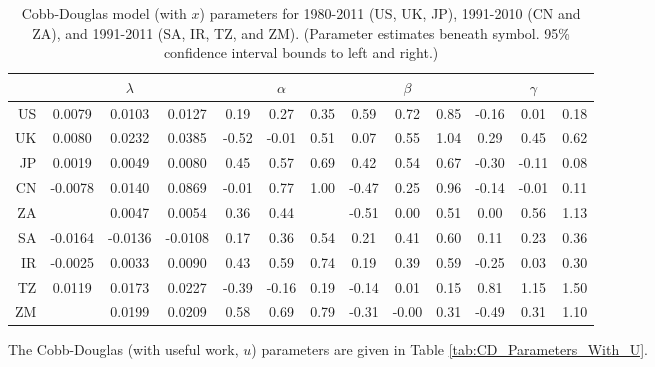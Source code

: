 \documentclass[preprint,authoryear,12pt]{elsarticle}\usepackage{graphicx, color}
\begin{document}
\begin{table}[H]
\begin{center}
\caption{Cobb-Douglas model (with $x$) parameters for 1980-2011 (US, UK, JP), 1991-2010 (CN and ZA), and 1991-2011 (SA, IR, TZ, and ZM). (Parameter estimates beneath symbol. 95\% confidence interval bounds to left and right.)}
\label{tab:CD_Parameters_With_X}
{\tiny
\begin{tabular}{r|ccc|ccc|ccc|ccc}
  \hline
 &   & $\lambda$ &   &   & $\alpha$ &   &   & $\beta$ &   &   & $\gamma$ &   \\ 
  \hline
US & 0.0079 & 0.0103 & 0.0127 & 0.19 & 0.27 & 0.35 & 0.59 & 0.72 & 0.85 & -0.16 & 0.01 & 0.18 \\ 
  UK & 0.0080 & 0.0232 & 0.0385 & -0.52 & -0.01 & 0.51 & 0.07 & 0.55 & 1.04 & 0.29 & 0.45 & 0.62 \\ 
  JP & 0.0019 & 0.0049 & 0.0080 & 0.45 & 0.57 & 0.69 & 0.42 & 0.54 & 0.67 & -0.30 & -0.11 & 0.08 \\ 
  CN & -0.0078 & 0.0140 & 0.0869 & -0.01 & 0.77 & 1.00 & -0.47 & 0.25 & 0.96 & -0.14 & -0.01 & 0.11 \\ 
  ZA &  & 0.0047 & 0.0054 & 0.36 & 0.44 &  & -0.51 & 0.00 & 0.51 & 0.00 & 0.56 & 1.13 \\ 
  SA & -0.0164 & -0.0136 & -0.0108 & 0.17 & 0.36 & 0.54 & 0.21 & 0.41 & 0.60 & 0.11 & 0.23 & 0.36 \\ 
  IR & -0.0025 & 0.0033 & 0.0090 & 0.43 & 0.59 & 0.74 & 0.19 & 0.39 & 0.59 & -0.25 & 0.03 & 0.30 \\ 
  TZ & 0.0119 & 0.0173 & 0.0227 & -0.39 & -0.16 & 0.19 & -0.14 & 0.01 & 0.15 & 0.81 & 1.15 & 1.50 \\ 
  ZM &  & 0.0199 & 0.0209 & 0.58 & 0.69 & 0.79 & -0.31 & -0.00 & 0.31 & -0.49 & 0.31 & 1.10 \\ 
   \hline
\end{tabular}
}
\end{center}
\end{table}



The Cobb-Douglas (with useful work, $u$) parameters are given in Table \ref{tab:CD_Parameters_With_U}.
\end{document}

